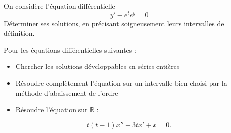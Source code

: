 \documentclass{book}
\begin{document}
\begin{Exercice}
On considère l'équation différentielle
$$y'-e^t e^y=0$$
Déterminer ses solutions, en précisant soigneusement leurs intervalles de définition.
\end{Exercice}
\begin{Exercice}
Pour les équations différentielles suivantes :
\begin{itemize}
\item Chercher les solutions développables en séries entières
\item Résoudre complètement l'équation sur un intervalle bien choisi par la méthode d'abaissement de l'ordre
\item Résoudre l'équation sur $\mathbb{R}$ :
\end{itemize}
$$ t(t-1)x''+3tx'+x=0.$$
\end{Exercice}
\end{document}
